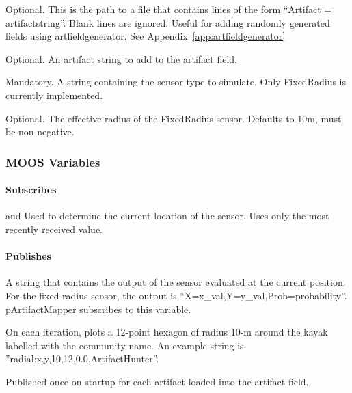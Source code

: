 \begin{hangpar}{\pin}{}
Optional. This is the path to a file that contains lines of the form ``Artifact = artifactstring''.  Blank lines are ignored.  Useful for adding randomly generated fields using artfieldgenerator.  See Appendix~\ref{app:artfieldgenerator}
\end{hangpar}

\begin{hangpar}{\pin}{}
Optional. An artifact string to add to the artifact field.
\end{hangpar}

\begin{hangpar}{\pin}{}
Mandatory. A string containing the sensor type to simulate.  Only FixedRadius is currently implemented.
\end{hangpar}

\begin{hangpar}{\pin}{}
Optional. The effective radius of the FixedRadius sensor.  Defaults to 10m, must be non-negative.
\end{hangpar}

\subsubsection{MOOS Variables}
\paragraph{Subscribes}
\begin{hangpar}{\pin}{ and }
Used to determine the current location of the sensor.  Uses only the most recently received value.
\end{hangpar}
\paragraph{Publishes}
\begin{hangpar}{\pin}{}
A string that contains the output of the sensor evaluated at the current position.  For the fixed radius sensor, the output is ``X=x\_val,Y=y\_val,Prob=probability''.  pArtifactMapper subscribes to this variable.
\end{hangpar}

\begin{hangpar}{\pin}{}
On each iteration, plots a 12-point hexagon of radius 10-m around the kayak labelled with the community name.  An example string is ''radial:x,y,10,12,0.0,ArtifactHunter''.
\end{hangpar}

\begin{hangpar}{\pin}{}
Published once on startup for each artifact loaded into the artifact field.
\end{hangpar}
